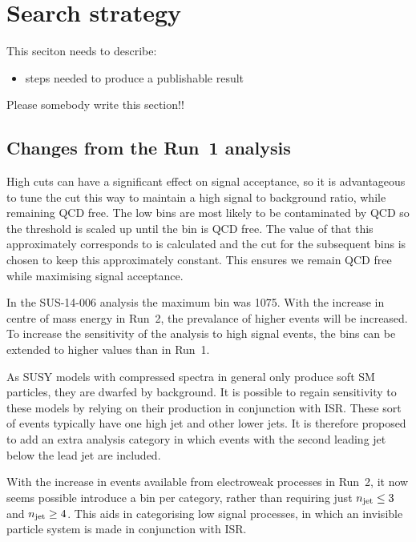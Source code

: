 \section{Search strategy}
\label{sec:strategy}


This seciton needs to describe:

\begin{itemize}
 \item steps needed to produce a publishable result
\end{itemize}

Please somebody write this section!!


\subsection{Changes from the Run~1 analysis}

High \alphat cuts can have a significant effect on signal acceptance, so it is
advantageous to tune the cut this way to maintain a high signal to background
ratio, while remaining QCD free. The low \HT bins are most likely to be 
contaminated by QCD so the \alphat threshold 
is scaled up until the bin is QCD free. The value of \mht that this
approximately corresponds to is calculated and the \alphat cut for the
subsequent bins is chosen to keep this \mht approximately constant. This ensures
we remain QCD free while maximising signal acceptance.

In the SUS-14-006 analysis the maximum \HT bin was 1075. With the increase in
centre of mass energy in Run~2, the prevalance of higher \HT events will be
increased. To increase the sensitivity
of the analysis to high \HT signal events, the \HT bins can be extended to higher
values than in Run~1.

As SUSY models with compressed spectra in general only produce soft SM
particles, they are dwarfed by background. It is possible to regain sensitivity
to these models by relying on their production in conjunction with ISR. These
sort of events typically have one high \PT jet and other lower \PT jets. It is
therefore proposed to add an extra analysis category in which events with the
second leading jet below the lead jet are included.

With the increase in events available from electroweak processes in Run~2, it
now seems possible introduce a bin per \njet category, rather than requiring
just $n_{\text{jet}} \leq 3$ and $n_{\text{jet}} \geq 4$. This aids in categorising low \njet signal
processes, in which an invisible particle system is made in conjunction with ISR.
